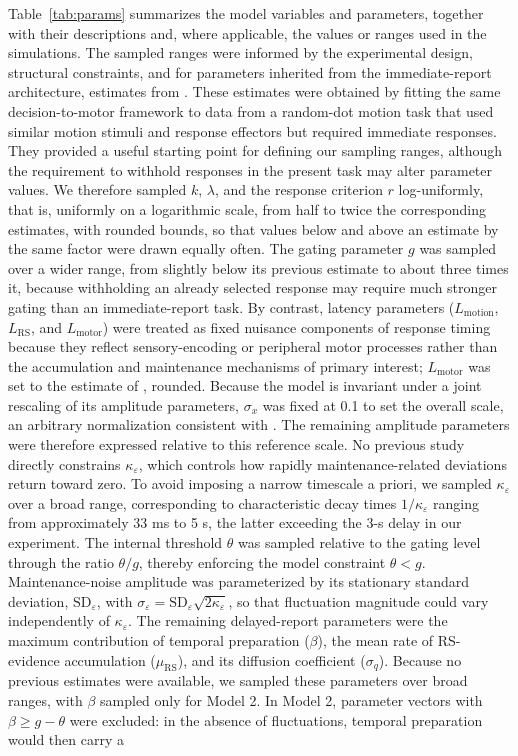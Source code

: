 \documentclass[a4paper,11pt]{article}
\theoremstyle{definition}
\newcommand{\1}{\mathbbm{1}}
\begin{document}
Table~\ref{tab:params} summarizes the model variables and parameters, together with their descriptions and, where applicable, the values or ranges used in the simulations. The sampled ranges were informed by the experimental design, structural constraints, and for parameters inherited from the immediate-report architecture, estimates from \textcite{dendauwGatedCascadeDiffusion2024}. These estimates were obtained by fitting the same decision-to-motor framework to data from a random-dot motion task that used similar motion stimuli and response effectors but required immediate responses. They provided a useful starting point for defining our sampling ranges, although the requirement to withhold responses in the present task may alter parameter values. We therefore sampled $k$, $\lambda$, and the response criterion $r$ log-uniformly, that is, uniformly on a logarithmic scale, from half to twice the corresponding estimates, with rounded bounds, so that values below and above an estimate by the same factor were drawn equally often. The gating parameter $g$ was sampled over a wider range, from slightly below its previous estimate to about three times it, because withholding an already selected response may require much stronger gating than an immediate-report task. By contrast, latency parameters ($L_{\mathrm{motion}}$, $L_{\mathrm{RS}}$, and $L_{\mathrm{motor}}$) were treated as fixed nuisance components of response timing because they reflect sensory-encoding or peripheral motor processes rather than the accumulation and maintenance mechanisms of primary interest; $L_{\mathrm{motor}}$ was set to the estimate of \textcite{dendauwGatedCascadeDiffusion2024}, rounded. Because the model is invariant under a joint rescaling of its amplitude parameters, $\sigma_{x}$ was fixed at 0.1 to set the overall scale, an arbitrary normalization consistent with \textcite{dendauwGatedCascadeDiffusion2024}. The remaining amplitude parameters were therefore expressed relative to this reference scale. No previous study directly constrains $\kappa_{\varepsilon}$, which controls how rapidly maintenance-related deviations return toward zero. To avoid imposing a narrow timescale a priori, we sampled $\kappa_\varepsilon$ over a broad range, corresponding to characteristic decay times $1/\kappa_\varepsilon$ ranging from approximately 33 ms to 5 s, the latter exceeding the 3-s delay in our experiment. The internal threshold $\theta$ was sampled relative to the gating level through the ratio $\theta/g$, thereby enforcing the model constraint $\theta<g$. Maintenance-noise amplitude was parameterized by its stationary standard deviation, $\mathrm{SD}_{\varepsilon}$, with $\sigma_{\varepsilon}=\mathrm{SD}_{\varepsilon}\sqrt{2\kappa_{\varepsilon}}$, so that fluctuation magnitude could vary independently of $\kappa_{\varepsilon}$. The remaining delayed-report parameters were the maximum contribution of temporal preparation ($\beta$), the mean rate of RS-evidence accumulation ($\mu_{\mathrm{RS}}$), and its diffusion coefficient ($\sigma_q$). Because no previous estimates were available, we sampled these parameters over broad ranges, with $\beta$ sampled only for Model 2. In Model 2, parameter vectors with $\beta\ge g-\theta$ were excluded: in the absence of fluctuations, temporal preparation would then carry a 
\end{document}
